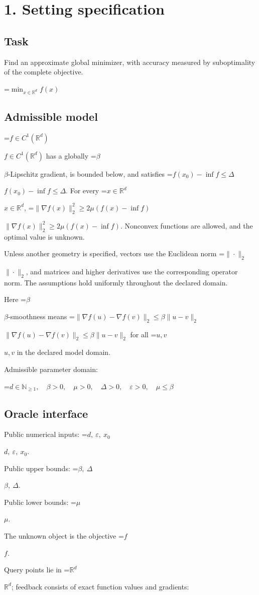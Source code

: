 \documentclass[10pt,a4paper]{article}
\newcommand{\AtlasMath}[1]{\par\begingroup\centering\setbox0=\hbox{$\displaystyle #1$}\ifdim\wd0>1.4\linewidth\typeout{ATLAS WIDE FORMULA: \the\wd0}\fi\ifdim\wd0>\linewidth\resizebox{\linewidth}{!}{\box0}\else\box0\fi\par\endgroup}
\newcommand{\AtlasInlineMath}[1]{\begingroup\setbox0=\hbox{$#1$}\ifdim\wd0>.4\linewidth\endgroup\AtlasMath{#1}\else\endgroup$#1$\fi}
\begin{document}
\section{1. Setting specification}
\subsection{Task}
Find an approximate global minimizer, with accuracy measured by suboptimality of the complete objective.


\AtlasMath{\min_{x\in \mathbb{R}^d}f(x)}


\subsection{Admissible model}
\AtlasInlineMath{f\in C^1(\mathbb R^d)} has a globally \AtlasInlineMath{\beta}-Lipschitz gradient, is bounded below, and satisfies \AtlasInlineMath{f(x_0)-\inf f\le\Delta}. For every \AtlasInlineMath{x\in\mathbb R^d}, \AtlasInlineMath{\|\nabla f(x)\|_2^2\ge2\mu(f(x)-\inf f)}. Nonconvex functions are allowed, and the optimal value is unknown.

Unless another geometry is specified, vectors use the Euclidean norm \AtlasInlineMath{\|\cdot\|_2}, and matrices and higher derivatives use the corresponding operator norm. The assumptions hold uniformly throughout the declared domain.

Here \AtlasInlineMath{\beta}-smoothness means \AtlasInlineMath{\|\nabla f(u)-\nabla f(v)\|_2\le\beta\|u-v\|_2} for all \AtlasInlineMath{u,v} in the declared model domain.

Admissible parameter domain:


\AtlasMath{d\in\mathbb{N}_{\ge1},\quad \beta>0,\quad \mu>0,\quad \Delta>0,\quad \varepsilon>0,\quad \mu\le\beta}


\subsection{Oracle interface}
Public numerical inputs: \AtlasInlineMath{d,\ \varepsilon,\ x_0}.

Public upper bounds: \AtlasInlineMath{\beta,\ \Delta}.

Public lower bounds: \AtlasInlineMath{\mu}.

The unknown object is the objective \AtlasInlineMath{f}.

Query points lie in \AtlasInlineMath{\mathbb{R}^d}; feedback consists of exact function values and gradients:
\end{document}
